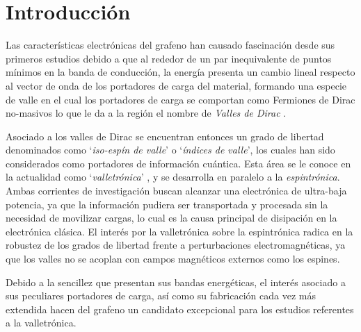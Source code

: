 \chapter{Introducción}


Las características electrónicas del grafeno han causado fascinación desde sus 
primeros estudios debido a que al rededor de un par inequivalente de puntos mínimos en la banda de conducción, la energía presenta un cambio lineal respecto al vector de onda de los portadores de carga del material, formando una especie de valle en el cual los portadores de carga se comportan como Fermiones de Dirac no-masivos lo que le da a la región el nombre de \emph{Valles de Dirac} 
\autocite{DiVincenzo1984, Gorbar2002, Kopelevich2003}.

Asociado a los valles de Dirac se encuentran entonces un grado de libertad denominados como `\emph{iso-espín de valle}' o `\emph{índices de valle}', los cuales han sido considerados como portadores de información cuántica. 
Esta área se le conoce en la actualidad como `\emph{valletrónica}' \autocite{Schaibley2016}, y se desarrolla en paralelo a la \emph{espintrónica}.
Ambas corrientes de investigación buscan alcanzar una electrónica de ultra-baja potencia, ya que la información pudiera ser transportada y procesada sin la necesidad de movilizar cargas, lo cual es la causa principal de disipación en la electrónica clásica. 
El interés por la valletrónica sobre la espintrónica radica en la robustez de los grados de libertad frente a perturbaciones electromagnéticas, ya que los valles no se acoplan con campos magnéticos externos como los espines.

Debido a la sencillez que presentan sus bandas energéticas, el interés asociado a sus peculiares portadores de carga, así como su fabricación cada vez más extendida hacen del grafeno un candidato excepcional para los estudios referentes a la valletrónica. 

